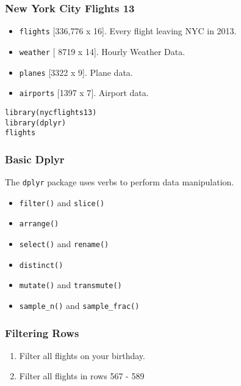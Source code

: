 \documentclass[]{article}
\providecommand{\tightlist}{%
  \setlength{\itemsep}{0pt}\setlength{\parskip}{0pt}}
\begin{document}
\subsubsection{New York City Flights 13}\label{new-york-city-flights-13}

\begin{itemize}
\tightlist
\item
  \texttt{flights} {[}336,776 x 16{]}. Every flight leaving NYC in 2013.
\item
  \texttt{weather} {[} 8719 x 14{]}. Hourly Weather Data.
\item
  \texttt{planes} {[}3322 x 9{]}. Plane data.
\item
  \texttt{airports} {[}1397 x 7{]}. Airport data.
\end{itemize}

\begin{verbatim}
library(nycflights13)
library(dplyr)
flights
\end{verbatim}

\subsubsection{Basic Dplyr}\label{basic-dplyr}

The \texttt{dplyr} package uses verbs to perform data manipulation.

\begin{itemize}
\tightlist
\item
  \texttt{filter()} and \texttt{slice()}
\item
  \texttt{arrange()}
\item
  \texttt{select()} and \texttt{rename()}
\item
  \texttt{distinct()}
\item
  \texttt{mutate()} and \texttt{transmute()}
\item
  \texttt{sample\_n()} and \texttt{sample\_frac()}
\end{itemize}

\subsubsection{Filtering Rows}\label{filtering-rows}

\begin{enumerate}
\def\labelenumi{\arabic{enumi}.}
\tightlist
\item
  Filter all flights on your birthday.
\item
  Filter all flights in rows 567 - 589
\end{enumerate}
\end{document}

